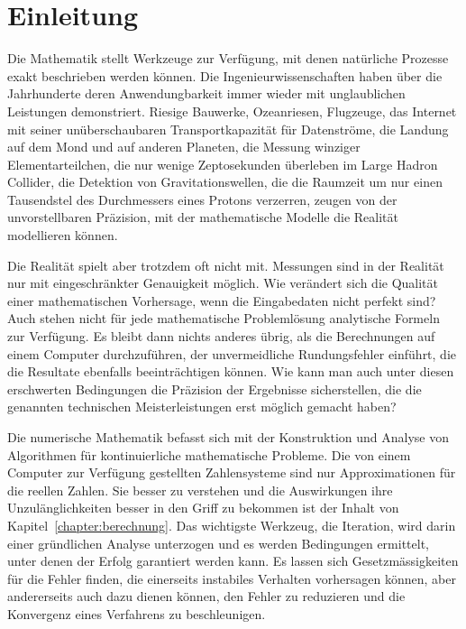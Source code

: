 %
%
%
\chapter*{Einleitung\label{chapter:einleitung}}
\rhead{}
Die Mathematik stellt Werkzeuge zur Verfügung, mit denen natürliche
Prozesse exakt beschrieben werden können.
Die Ingenieurwissenschaften haben über die Jahrhunderte deren
Anwendungbarkeit immer wieder mit unglaublichen Leistungen
demonstriert.
Riesige Bauwerke, Ozeanriesen, Flugzeuge, das Internet mit seiner
unüberschaubaren Transportkapazität für Datenströme, die Landung auf
dem Mond und auf anderen Planeten, die Messung winziger Elementarteilchen,
die nur wenige Zeptosekunden überleben im Large Hadron Collider, die 
Detektion von Gravitationswellen, die die Raumzeit um nur einen Tausendstel
des Durchmessers eines Protons verzerren, zeugen von der unvorstellbaren
Präzision, mit der mathematische Modelle die Realität modellieren können.

Die Realität spielt aber trotzdem oft nicht mit.
Messungen sind in der Realität nur mit eingeschränkter Genauigkeit
möglich.
Wie verändert sich die Qualität einer mathematischen Vorhersage,
wenn die Eingabedaten nicht perfekt sind?
Auch stehen nicht für jede mathematische Problemlösung analytische
Formeln zur Verfügung.
Es bleibt dann nichts anderes übrig, als die Berechnungen auf einem
Computer durchzuführen, der unvermeidliche Rundungsfehler einführt,
die die Resultate ebenfalls beeinträchtigen können.
%
Wie kann man auch unter diesen erschwerten Bedingungen die Präzision
der Ergebnisse sicherstellen, die die genannten technischen Meisterleistungen
erst möglich gemacht haben?

Die numerische Mathematik befasst sich mit der Konstruktion und Analyse
von Algorithmen für kontinuierliche mathematische Probleme.
%
Die von einem Computer zur Verfügung gestellten Zahlensysteme sind nur
Approximationen für die reellen Zahlen.
%
%
Sie besser zu verstehen und die Auswirkungen ihre Unzulänglichkeiten 
besser in den Griff zu bekommen ist der Inhalt von
Kapitel~\ref{chapter:berechnung}.
Das wichtigste Werkzeug, die Iteration, wird darin einer gründlichen
Analyse unterzogen und es werden Bedingungen ermittelt, unter denen
der Erfolg garantiert werden kann.
%
Es lassen sich Gesetzmässigkeiten für die Fehler finden, die einerseits
instabiles Verhalten vorhersagen können, aber andererseits auch dazu
dienen können, den Fehler zu reduzieren und die Konvergenz eines
Verfahrens zu beschleunigen.
%

